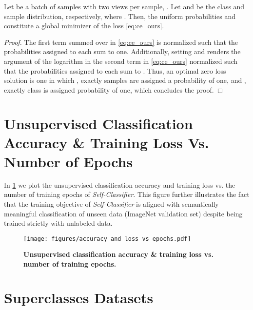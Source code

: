 \documentclass[runningheads]{llncs}
\begin{document}
\begin{theorem}
\label{theorem:appendix_custom_optimal_sol}
Let  be a batch of  samples with two views per sample, . Let  and  be the class and sample distribution, respectively, where . Then, the uniform probabilities  and  constitute a global minimizer of the loss \cref{eq:ce_ours}.
\end{theorem}

\begin{proof}
The first term  summed over  in \cref{eq:ce_ours} is normalized such that the probabilities assigned to each  sum to one. Additionally, setting  and  renders the argument   of the logarithm in the second term in \cref{eq:ce_ours} normalized such that the probabilities assigned to each  sum to . Thus, an optimal zero loss solution is one in which , exactly  samples are assigned a probability of one, and , exactly  class is assigned probability of one, which concludes the proof.
\end{proof}

\section{Unsupervised Classification Accuracy \& Training Loss Vs. Number of Epochs}
\label{section:acc_loss_vs_epochs}
In \cref{fig:clustering_acc} we plot the unsupervised classification accuracy and training loss vs. the number of training epochs of \textit{Self-Classifier}. This figure further illustrates the fact that the training objective of \textit{Self-Classifier} is aligned with semantically meaningful classification of unseen data (ImageNet validation set) despite being trained strictly with unlabeled data.

\begin{figure}[ht]
    \centering
    \texttt{[image: figures/accuracy\_and\_loss\_vs\_epochs.pdf]}
    \caption{\textbf{Unsupervised classification accuracy \& training loss vs. number of training epochs.}}
    \label{fig:clustering_acc} 
\end{figure}






\newpage
\section{Superclasses Datasets}
\label{section:superclassess_datasets}
\end{document}
